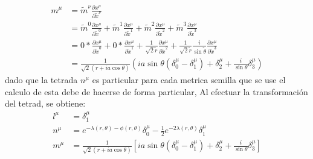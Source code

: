 \begin{enumerate}[1]
            \begin{equation}
                \begin{aligned}
                    m^\mu & =\tilde{m}^\nu \frac{\partial x^\mu}{\partial \tilde{x}^\nu}                                                                                   \\
                            & =\tilde{m}^0 \frac{\partial x^\mu}{\partial \tilde{x}^0}+\tilde{m}^1 \frac{\partial x^\mu}{\partial \tilde{x}^1}+\tilde{m}^2 \frac{\partial x^\mu}{\partial \tilde{x}^2}+\tilde{m}^3 \frac{\partial x^\mu}{\partial \tilde{x}^3}\\
                            & = 0* \frac{\partial x^\mu}{\partial \tilde{x}^0} + 0* \frac{\partial x^\mu}{\partial \tilde{x}^1} +\frac{1}{\sqrt{2} \tilde{r}}\frac{\partial x^\mu}{\partial \tilde{x}^2} + \frac{1}{\sqrt{2} \tilde{r}}\frac{i}{\sin \tilde{\theta}}\frac{\partial x^\mu}{\partial \tilde{x}^3}\\
                            &=\frac{1}{\sqrt{2}(r+i a \cos \theta)}\left(i a \sin \theta\left(\delta_0^\mu-\delta_1^\mu\right)+\delta_2^\mu+\frac{i}{\sin \theta} \delta_3^\mu\right)
                \end{aligned}
            \end{equation}
            dado que la tetrada $n^\mu$ es particular para cada metrica semilla que se use el calculo de esta debe de hacerse de forma particular, 
          Al efectuar la transformación del tetrad, se obtiene:
          \begin{equation}
              \begin{aligned}
                  l^\mu & =\delta_1^\mu                                                                                                                                            \\
                  n^\mu & =e^{-\lambda(r, \theta)-\phi(r, \theta)} \delta_0^\mu-\frac{1}{2} e^{-2 \lambda(r, \theta)} \delta_1^\mu                                                 \\
                  m^\mu & =\frac{1}{\sqrt{2}(r+i a \cos \theta)}\left[i a \sin \theta\left(\delta_0^\mu-\delta_1^\mu\right)+\delta_2^\mu+\frac{i}{\sin \theta} \delta_3^\mu\right]
              \end{aligned}
          \end{equation}




\end{enumerate}
